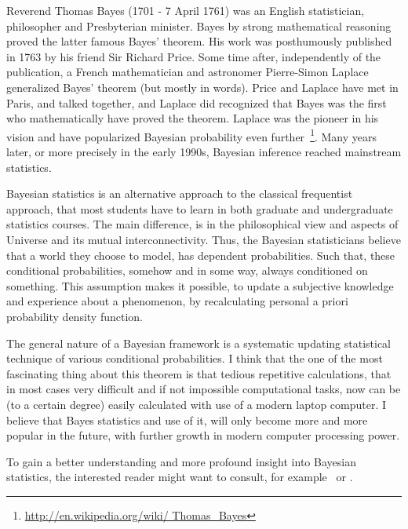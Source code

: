 \documentclass[a4paper,11pt,english]{article}
\begin{document}
		Reverend Thomas Bayes (1701 - 7 April 1761) was an English statistician, philosopher and Presbyterian minister. Bayes by strong mathematical 
		reasoning proved the latter famous Bayes' theorem. His work was posthumously published in 1763 by his friend Sir Richard Price. 
		Some time after, independently of the publication, a French mathematician and astronomer Pierre-Simon Laplace generalized Bayes' theorem 
		(but mostly in words). Price and Laplace have met in Paris, and talked together, and Laplace did recognized that Bayes was the first who
		mathematically have proved the theorem. Laplace was the pioneer in his vision and have popularized Bayesian probability even 
		further~\footnote{\url{http://en.wikipedia.org/wiki/ Thomas_Bayes}}. Many years later, or more precisely in the early 1990s, Bayesian inference 
		reached mainstream statistics. 
			
		Bayesian statistics is an alternative approach to the classical frequentist approach, that most students have to learn in both graduate and 
		undergraduate statistics courses. The main difference, is in the philosophical view and aspects of Universe and its 
		mutual interconnectivity. Thus, the Bayesian statisticians believe that a world they choose to model, has dependent probabilities. Such that, these 
		conditional probabilities, somehow and in some way, always conditioned on something. This assumption makes it possible, to update a subjective 
		knowledge and experience about a phenomenon, by recalculating personal a priori probability density function. 
	
		The general nature of a Bayesian framework is a systematic updating statistical technique of various conditional probabilities. I think that the
		one of the most fascinating thing about this theorem is that tedious repetitive calculations, that in most cases very difficult and if not 
		impossible computational tasks, now can be (to a certain degree) easily calculated with use of a modern laptop computer. I believe that Bayes 
		statistics and use of it, will only become more and more popular in the future, with further growth in modern computer processing power.
	
		To gain a better understanding and more profound insight into Bayesian statistics, the interested reader might want to consult, for 
		example~\citep[chap. 2.1]{lee} or \citep[pp. 241-243]{brandimarte}.


\end{document}
